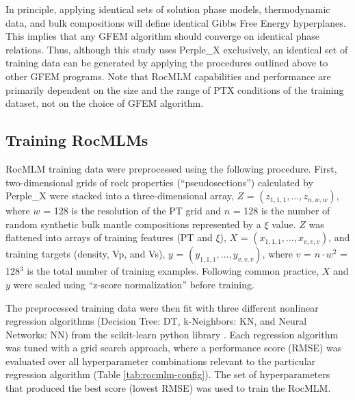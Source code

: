 \documentclass[draft,linenumbers]{agujournal2018}
\begin{document}
In principle, applying identical sets of solution phase models, thermodynamic data, and bulk compositions will define identical Gibbs Free Energy hyperplanes. This implies that any GFEM algorithm should converge on identical phase relations. Thus, although this study uses Perple\_X exclusively, an identical set of training data can be generated by applying the procedures outlined above to other GFEM programs. Note that RocMLM capabilities and performance are primarily dependent on the size and the range of PTX conditions of the training dataset, not on the choice of GFEM algorithm.

\subsection{Training RocMLMs}\label{sec:train-rocmlms}

RocMLM training data were preprocessed using the following procedure. First, two-dimensional grids of rock properties (``pseudosections'') calculated by Perple\_X were stacked into a three-dimensional array, \(Z\) = \((z_{1,1,1}, \ldots,z_{n,w,w})\), where \(w\) = 128 is the resolution of the PT grid and \(n\) = 128 is the number of random synthetic bulk mantle compositions represented by a \(\xi\) value. \(Z\) was flattened into arrays of training features (PT and \(\xi\)), \(X\) = \((x_{1,1,1}, \ldots, x_{v,v,v})\), and training targets (density, Vp, and Vs), \(y\) = \((y_{1,1,1}, \ldots, y_{v,v,v})\), where \(v\) = \(n \cdot w^2\) = 128\(^3\) is the total number of training examples. Following common practice, \(X\) and \(y\) were scaled using ``z-score normalization'' before training.

The preprocessed training data were then fit with three different nonlinear regression algorithms (Decision Tree: DT, k-Neighbors: KN, and Neural Networks: NN) from the scikit-learn python library \citep{scikit2011}. Each regression algorithm was tuned with a grid search approach, where a performance score (RMSE) was evaluated over all hyperparameter combinations relevant to the particular regression algorithm (Table \ref{tab:rocmlm-config}). The set of hyperparameters that produced the best score (lowest RMSE) was used to train the RocMLM.
\end{document}
